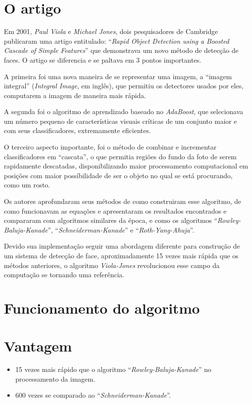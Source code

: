 \documentclass[12pt,a4paper]{article}
\begin{document}
\section{O artigo}
Em 2001, \textit{Paul Viola} e \textit{Michael Jones}, dois pesquisadores de Cambridge publicaram uma artigo entitulado: “\textit{Rapid Object Detection using a Boosted Cascade of Simple Features}” que demonstrava um novo método de detecção de faces. O artigo se diferencia e se paltava em 3 pontos importantes. 

A primeira foi uma nova maneira de se representar uma imagem, a “imagem integral” (\textit{Integral Image}, em inglês), que permitiu os detectores usados por eles, computarem a imagem de maneira mais rápida.

A segunda foi o algoritmo de aprendizado baseado no \textit{AdaBoost}, que selecionava um número pequeno de características visuais críticas de um conjunto maior e com seus classificadores, extremamente eficientes.

O terceiro aspecto importante, foi o método de combinar e incrementar classificadores em “cascata”, o que permitia regiões do fundo da foto de serem rapidamente descatadas, disponibilizando maior processamento computacional em posições com maior possíbilidade de ser o objeto no qual se está procurando, como um rosto.

Os autores aprofundaram seus métodos de como construiram esse algoritmo, de como funcionavam as equações e apresentaram os resultados encontrados e compararam com algoritmos similares da época, e como os algoritmos “\textit{Rowley-Baluja-Kanade}”, “\textit{Schneiderman-Kanade}” e “\textit{Roth-Yang-Ahuja}”.

Devido sua implementação seguir uma abordagem diferente para  construção de um sistema de detecção de face, aproximadamente 15 vezes mais rápida que os métodos anteriores, o algoritmo \textit{Viola-Jones} revolucionou esse campo da computação se tornando uma referência.

\section{Funcionamento do algoritmo}



\section{Vantagem}
\begin{itemize}
	\item 15 vezes mais rápido que o algoritmo “\textit{Rowley-Baluja-Kanade}” no processamento da imagem.

	\item 600 vezes se comparado ao “\textit{Schneiderman-Kanade}”.
\end{itemize}
\end{document}
